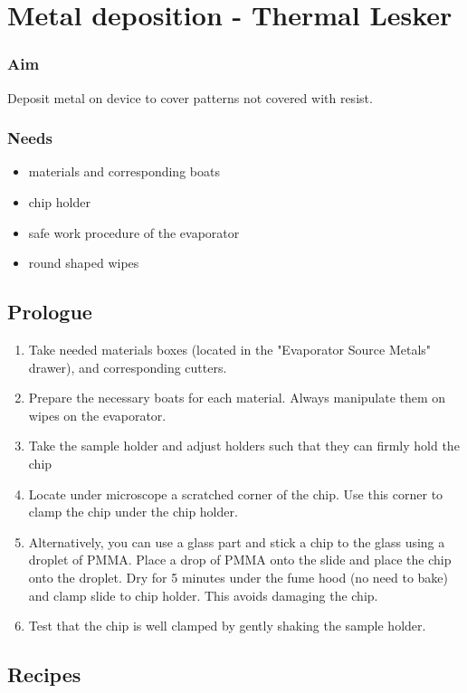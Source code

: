 \section{Metal deposition - Thermal Lesker}
\subsubsection{Aim}
Deposit metal on device to cover patterns not covered with resist.

\subsubsection{Needs}
\begin{itemize}[noitemsep]
  \item materials and corresponding boats
  \item chip holder
  \item safe work procedure of the evaporator
  \item round shaped wipes
\end{itemize}

\subsection{Prologue}
\begin{enumerate}
\item Take needed materials boxes (located in the "Evaporator Source Metals" drawer), and corresponding cutters.
\item Prepare the necessary boats for each material. Always manipulate them on wipes on the evaporator.
\item Take the sample holder and adjust holders such that they can firmly hold the chip
\item Locate under microscope a scratched corner of the chip. Use this corner to clamp the chip under the chip holder.
\item Alternatively, you can use a glass part and stick a chip to the glass using a droplet of PMMA. Place
a drop of PMMA onto the slide and place the chip onto the droplet. Dry for 5 minutes under the fume hood (no need to bake)
and clamp slide to chip holder. This avoids damaging the chip.
\item Test that the chip is well clamped by gently shaking the sample holder.
\end{enumerate}
\newpage
\subsection{Recipes}

